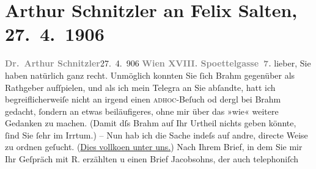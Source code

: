               \section[Arthur Schnitzler an Felix Salten, 27. 4. 1906]{ Arthur Schnitzler an Felix Salten, 27. 4. 1906}\nopagebreak{}\rehead{ }\begin{ledgroupsized}[t]{13cm}\normalsize\beginnumbering \toendnotes[C]{\smallbreak\pagebreak[2]} 
\toendnotes[C]{\smallbreak}\pstart
           \noindent{}\textcolor{gray}{\textbf{Dr. Arthur Schnitzler}}\hfill {\pb}27. 4. 906\pend
           \pstart
           \textcolor{gray}{\textbf{Wien XVIII. Spoettelgasse 7.}}\pend
           \pstart
           lieber, Sie haben natürlich ganz recht. Unmöglich konnten Sie ſich
                  Brahm gegenüber als Rathgeber aufſpielen,
               und als ich mein Telegra{\geminationm} an Sie abſandte, hatt ich
               begreiflicherweiſe nicht an irgend einen \textsc{adhoc}-Beſuch od
               dergl bei Brahm gedacht, ſondern an etwas
               beiläufigeres, ohne mir über das »wie« weitere Gedanken zu machen. (Damit dſs Brahm auf Ihr Urtheil nichts geben könnte, ſind
               Sie ſehr im Irrtum.) – Nun hab ich die Sache indeſs auf andre, directe Weise zu
               ordnen geſucht. {\pb}(\uline{Dies vollko{\geminationm}en unter uns.}) Nach Ihrem Brief, in
               dem Sie mir Ihr Geſpräch mit R. erzählten u
               einen Brief Jacobsohns, der auch telephoniſch

\end{ledgroupsized}
